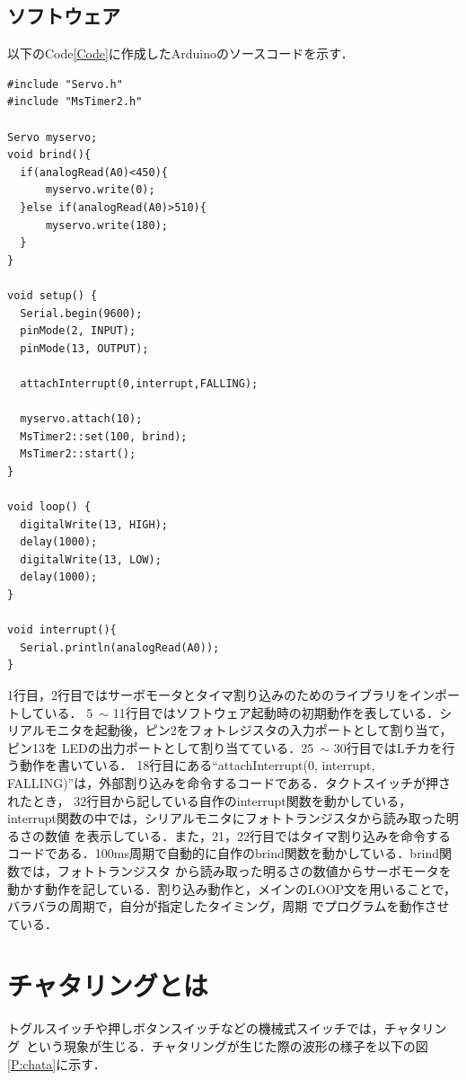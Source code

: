 \documentclass[a4paper,11pt]{jsarticle}
\begin{document}
\subsection{ソフトウェア}
以下のCode\ref{Code}に作成したArduinoのソースコードを示す．
\begin{lstlisting}[caption=Arduinoで作成したCode, label=Code]
#include "Servo.h"
#include "MsTimer2.h"

Servo myservo;
void brind(){
  if(analogRead(A0)<450){
      myservo.write(0); 
  }else if(analogRead(A0)>510){
      myservo.write(180);
  }
}

void setup() {
  Serial.begin(9600);
  pinMode(2, INPUT);
  pinMode(13, OUTPUT);
  
  attachInterrupt(0,interrupt,FALLING);
  
  myservo.attach(10);
  MsTimer2::set(100, brind);
  MsTimer2::start();
}

void loop() {
  digitalWrite(13, HIGH);  
  delay(1000);  
  digitalWrite(13, LOW);
  delay(1000);               
}

void interrupt(){
  Serial.println(analogRead(A0));
}
\end{lstlisting}\par
1行目，2行目ではサーボモータとタイマ割り込みのためのライブラリをインポートしている．
5\ $\sim$ 11行目ではソフトウェア起動時の初期動作を表している．シリアルモニタを起動後，ピン2をフォトレジスタの入力ポートとして割り当て，ピン13を
LEDの出力ポートとして割り当てている．25\ $\sim$ 30行目ではLチカを行う動作を書いている．
18行目にある``attachInterrupt(0, interrupt, FALLING)''は，外部割り込みを命令するコードである．タクトスイッチが押されたとき，
32行目から記している自作のinterrupt関数を動かしている，interrupt関数の中では，シリアルモニタにフォトトランジスタから読み取った明るさの数値
を表示している．また，21，22行目ではタイマ割り込みを命令するコードである．100ms周期で自動的に自作のbrind関数を動かしている．brind関数では，フォトトランジスタ
から読み取った明るさの数値からサーボモータを動かす動作を記している．割り込み動作と，メインのLOOP文を用いることで，バラバラの周期で，自分が指定したタイミング，周期
でプログラムを動作させている．

\section{チャタリングとは}
トグルスイッチや押しボタンスイッチなどの機械式スイッチでは，チャタリング~\cite{chataring}という現象が生じる．チャタリングが生じた際の波形の様子を以下の図\ref{P:chata}に示す．
\end{document}
